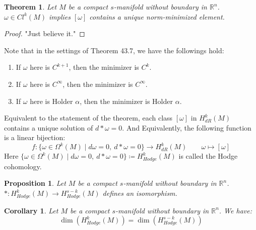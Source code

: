 \documentclass[15pt]{book}
\theoremstyle{break}
\theoremstyle{break}
\newtheorem{thm}{Theorem}[section]
\newtheorem{prop}[lem]{Proposition}
\newtheorem{corT}[lem]{Corollary}
\newtheorem{defn}{Definition}[corL]
\newcommand{\R}{\mathbb{R}}
\newcommand{\exercise}{\color{green}Exercise: \color{black}}
\begin{document}



\begin{thm}
Let $M$ be a compact $s$-manifold without boundary in $\R^n$. \\$\omega \in Cl^k(M)$ implies $[\omega]$ contains a unique norm-minimized element.
\end{thm}
\begin{proof}
"Just believe it."
\end{proof}
Note that in the settings of Theorem 43.7, we have the followings hold:
\begin{enumerate}[topsep=3pt,itemsep=-1ex,partopsep=1ex,parsep=1ex]
\item If $\omega$ here is $C^{k+1}$, then the minimizer is $C^k$.
\item If $\omega$ here is $C^{\infty}$, then the minimizer is $C^\infty$.
\item If $\omega$ here is Holder $\alpha$, then the minimizer is Holder $\alpha$.
\end{enumerate}
Equivalent to the statement of the theorem, each class $[\omega]$ in $H^k_{dR}(M)$ contains a unique solution of $d*\omega = 0$. And Equivalently, the following function is a linear bijection: 
$$f:\{ \omega \in \Omega^k(M)\mid d\omega = 0 , \ d*\omega = 0\} \to H_{dR}^k(M) \qquad \omega\mapsto [\omega]$$ 
Here $\{ \omega \in \Omega^k(M)\mid d\omega = 0 , \ d*\omega = 0\}  \coloneqq H_{Hodge}^k(M)$ is called the Hodge cohomology. \\

\begin{prop}
Let $M$ be a compact $s$-manifold without boundary in $\R^n$.\\
$*:H_{Hodge}^k(M) \to H_{Hodge}^{s-k}(M)$ defines an isomorphism.
\end{prop}

\begin{corT}
Let $M$ be a compact $s$-manifold without boundary in $\R^n$. We have:
$$\dim(H_{Hodge}^k(M)) = \dim(H_{Hodge}^{s-k}(M))$$
\end{corT}
\end{document}
